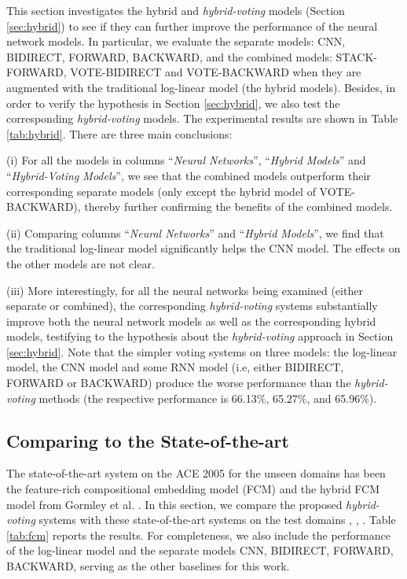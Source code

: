 \documentclass[11pt,letterpaper]{article}
\begin{document}
This section investigates the hybrid and {\it hybrid-voting} models (Section \ref{sec:hybrid}) to see if they can further improve the performance of the neural network models. In particular, we evaluate the separate models: CNN, BIDIRECT, FORWARD, BACKWARD, and the combined models: STACK-FORWARD, VOTE-BIDIRECT and VOTE-BACKWARD when they are augmented with the traditional log-linear model (the hybrid models). Besides, in order to verify the hypothesis in Section \ref{sec:hybrid}, we also test the corresponding {\it hybrid-voting} models. The experimental results are shown in Table \ref{tab:hybrid}. There are three main conclusions:







(i) For all the models in columns ``{\it Neural Networks}'', ``{\it Hybrid Models}'' and ``{\it Hybrid-Voting Models}'', we see that the combined models outperform their corresponding separate models (only except the hybrid model of VOTE-BACKWARD), thereby further confirming the benefits of the combined models.

(ii) Comparing columns ``{\it Neural Networks}'' and ``{\it Hybrid Models}'', we find that the traditional log-linear model significantly helps the CNN model. The effects on the other models are not clear.

(iii) More interestingly, for all the neural networks being examined (either separate or combined), the corresponding {\it hybrid-voting} systems substantially improve both the neural network models as well as the corresponding hybrid models, testifying to the hypothesis about the {\it hybrid-voting} approach in Section \ref{sec:hybrid}. Note that the simpler voting systems on three models: the log-linear model, the CNN model and some RNN model (i.e, either BIDIRECT, FORWARD or BACKWARD) produce the worse performance than the {\it hybrid-voting} methods (the respective performance is 66.13\%, 65.27\%, and 65.96\%).





\subsection{Comparing to the State-of-the-art}

The state-of-the-art system on the ACE 2005 for the unseen domains has been the feature-rich compositional embedding model (FCM) and the hybrid FCM model from Gormley et al. . In this section, we compare the proposed {\it hybrid-voting} systems with these state-of-the-art systems on the test domains , , . Table \ref{tab:fcm} reports the results. For completeness, we also include the performance of the log-linear model and the separate models CNN, BIDIRECT, FORWARD, BACKWARD, serving as the other baselines for this work.
\end{document}
